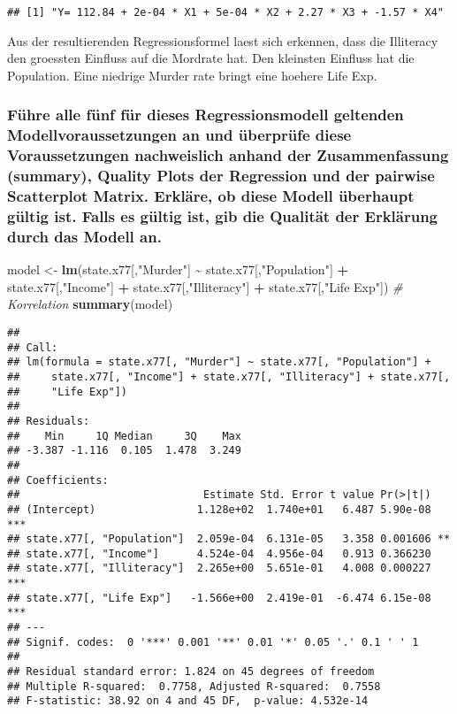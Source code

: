 \documentclass[
]{article}
\newenvironment{Shaded}{\begin{snugshade}}{\end{snugshade}}
\newcommand{\CommentTok}[1]{\textcolor[rgb]{0.56,0.35,0.01}{\textit{#1}}}
\newcommand{\FunctionTok}[1]{\textcolor[rgb]{0.13,0.29,0.53}{\textbf{#1}}}
\newcommand{\NormalTok}[1]{#1}
\newcommand{\OtherTok}[1]{\textcolor[rgb]{0.56,0.35,0.01}{#1}}
\newcommand{\SpecialCharTok}[1]{\textcolor[rgb]{0.81,0.36,0.00}{\textbf{#1}}}
\newcommand{\StringTok}[1]{\textcolor[rgb]{0.31,0.60,0.02}{#1}}
\begin{document}
\begin{verbatim}
## [1] "Y= 112.84 + 2e-04 * X1 + 5e-04 * X2 + 2.27 * X3 + -1.57 * X4"
\end{verbatim}

Aus der resultierenden Regressionsformel laest sich erkennen, dass die
Illiteracy den groessten Einfluss auf die Mordrate hat. Den kleinsten
Einfluss hat die Population. Eine niedrige Murder rate bringt eine
hoehere Life Exp.

\subsubsection{Führe alle fünf für dieses Regressionsmodell geltenden
Modellvoraussetzungen an und überprüfe diese Voraussetzungen
nachweislich anhand der Zusammenfassung (summary), Quality Plots der
Regression und der pairwise Scatterplot Matrix. Erkläre, ob diese Modell
überhaupt gültig ist. Falls es gültig ist, gib die Qualität der
Erklärung durch das Modell
an.}\label{fuxfchre-alle-fuxfcnf-fuxfcr-dieses-regressionsmodell-geltenden-modellvoraussetzungen-an-und-uxfcberpruxfcfe-diese-voraussetzungen-nachweislich-anhand-der-zusammenfassung-summary-quality-plots-der-regression-und-der-pairwise-scatterplot-matrix.-erkluxe4re-ob-diese-modell-uxfcberhaupt-guxfcltig-ist.-falls-es-guxfcltig-ist-gib-die-qualituxe4t-der-erkluxe4rung-durch-das-modell-an.}

\begin{Shaded}
\begin{Highlighting}[]
\NormalTok{model }\OtherTok{\textless{}{-}}  \FunctionTok{lm}\NormalTok{(state.x77[,}\StringTok{"Murder"}\NormalTok{] }\SpecialCharTok{\textasciitilde{}}\NormalTok{ state.x77[,}\StringTok{"Population"}\NormalTok{] }\SpecialCharTok{+}\NormalTok{ state.x77[,}\StringTok{"Income"}\NormalTok{] }\SpecialCharTok{+}\NormalTok{ state.x77[,}\StringTok{"Illiteracy"}\NormalTok{] }\SpecialCharTok{+}\NormalTok{ state.x77[,}\StringTok{"Life Exp"}\NormalTok{])}
\CommentTok{\# Korrelation}
\FunctionTok{summary}\NormalTok{(model)}
\end{Highlighting}
\end{Shaded}

\begin{verbatim}
## 
## Call:
## lm(formula = state.x77[, "Murder"] ~ state.x77[, "Population"] + 
##     state.x77[, "Income"] + state.x77[, "Illiteracy"] + state.x77[, 
##     "Life Exp"])
## 
## Residuals:
##    Min     1Q Median     3Q    Max 
## -3.387 -1.116  0.105  1.478  3.249 
## 
## Coefficients:
##                             Estimate Std. Error t value Pr(>|t|)    
## (Intercept)                1.128e+02  1.740e+01   6.487 5.90e-08 ***
## state.x77[, "Population"]  2.059e-04  6.131e-05   3.358 0.001606 ** 
## state.x77[, "Income"]      4.524e-04  4.956e-04   0.913 0.366230    
## state.x77[, "Illiteracy"]  2.265e+00  5.651e-01   4.008 0.000227 ***
## state.x77[, "Life Exp"]   -1.566e+00  2.419e-01  -6.474 6.15e-08 ***
## ---
## Signif. codes:  0 '***' 0.001 '**' 0.01 '*' 0.05 '.' 0.1 ' ' 1
## 
## Residual standard error: 1.824 on 45 degrees of freedom
## Multiple R-squared:  0.7758, Adjusted R-squared:  0.7558 
## F-statistic: 38.92 on 4 and 45 DF,  p-value: 4.532e-14
\end{verbatim}
\end{document}
